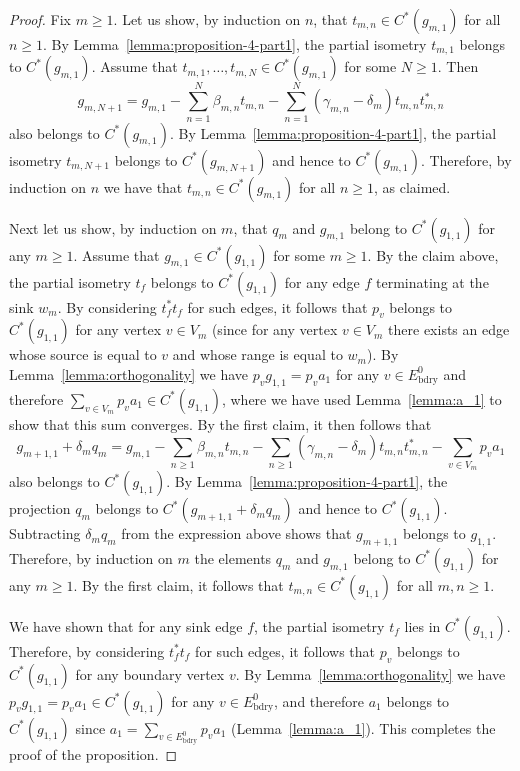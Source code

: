 \documentclass[12pt, a4paper]
{amsart}
\theoremstyle{definition}
\theoremstyle{remark}
\numberwithin{equation}{section}
\newcommand{\Eboundary}{E^0_{\mathrm{bdry}}}
\newcommand{\Cstar}{\ensuremath{C^*}}
\begin{document}
\begin{proof}    
    Fix $m \ge 1$. Let us show, by induction on $n$, that $t_{m,n} \in \Cstar(g_{m,1})$ for all $n \ge 1$. By Lemma~\ref{lemma:proposition-4-part1}, the partial isometry $t_{m,1}$ belongs to $\Cstar(g_{m,1})$. Assume that ${t_{m,1}, \dots, t_{m,N} \in \Cstar(g_{m,1})}$ for some $N \ge 1$. Then
    \begin{equation}
    g_{m,N+1} = g_{m,1} - \sum_{n=1}^N \beta_{m,n} t_{m,n} - \sum_{n=1}^N (\gamma_{m,n} - \delta_{m}) t_{m,n} t_{m,n}^*
    \end{equation}
    also belongs to $\Cstar(g_{m,1})$. By Lemma~\ref{lemma:proposition-4-part1}, the partial isometry $t_{m,N+1}$ belongs to $\Cstar(g_{m,N+1})$ and hence to $\Cstar(g_{m,1})$. Therefore, by induction on $n$ we have that $t_{m,n} \in \Cstar(g_{m,1})$ for all $n \ge 1$, as claimed.

    Next let us show, by induction on $m$, that $q_m$ and $g_{m,1}$ belong to $\Cstar(g_{1,1})$ for any $m \ge 1$. Assume that $g_{m,1} \in \Cstar(g_{1,1})$ for some $m \ge 1$. By the claim above, the partial isometry $t_f$ belongs to $C^*(g_{1,1})$ for any edge $f$ terminating at the sink $w_m$. By considering $t_f^* t_f$ for such edges, it follows that $p_v$ belongs to $C^*(g_{1,1})$ for any vertex $v \in V_m$ (since for any vertex $v \in V_m$ there exists an edge whose source is equal to $v$ and whose range is equal to $w_m$).
    By Lemma~\ref{lemma:orthogonality} we have $p_v g_{1,1} = p_v a_1$ for any $v \in \Eboundary$ and therefore $\sum_{v \in V_m} p_v a_1 \in C^*(g_{1,1})$, where we have used Lemma~\ref{lemma:a_1} to show that this sum converges. By the first claim, it then follows that
    \begin{equation}
    g_{m+1,1} + \delta_m q_m = g_{m,1} - \sum_{n\ge 1} \beta_{m,n} t_{m,n} - \sum_{n \ge 1} (\gamma_{m,n} - \delta_{m}) t_{m,n} t_{m,n}^* -\sum_{v \in V_m} p_v a_1
    \end{equation}
    also belongs to $\Cstar(g_{1,1})$. By Lemma~\ref{lemma:proposition-4-part1}, the projection $q_m$ belongs to $\Cstar(g_{m+1,1} + \delta_m q_m)$ and hence to $\Cstar(g_{1,1})$. Subtracting $\delta_m q_m$ from the expression above shows that $g_{m+1,1}$ belongs to $g_{1,1}$. Therefore, by induction on $m$ the elements $q_m$ and $g_{m,1}$ belong to $C^*(g_{1,1})$ for any $m \ge 1$. By the first claim, it follows that $t_{m,n} \in C^*(g_{1,1})$ for all $m,n \ge 1$.
    
    We have shown that for any sink edge $f$, the partial isometry $t_f$ lies in $C^*(g_{1,1})$. Therefore, by considering $t_f^* t_f$ for such edges, it follows that $p_v$ belongs to $C^*(g_{1,1})$ for any boundary vertex $v$. By Lemma~\ref{lemma:orthogonality} we have $p_v g_{1,1} = p_v a_1 \in C^*(g_{1,1})$ for any $v \in \Eboundary$, and therefore $a_1$ belongs to $C^*(g_{1,1})$ since $a_1 = \sum_{v \in \Eboundary} p_v a_1$ (Lemma~\ref{lemma:a_1}). This completes the proof of the proposition.
\end{proof}
\end{document}
